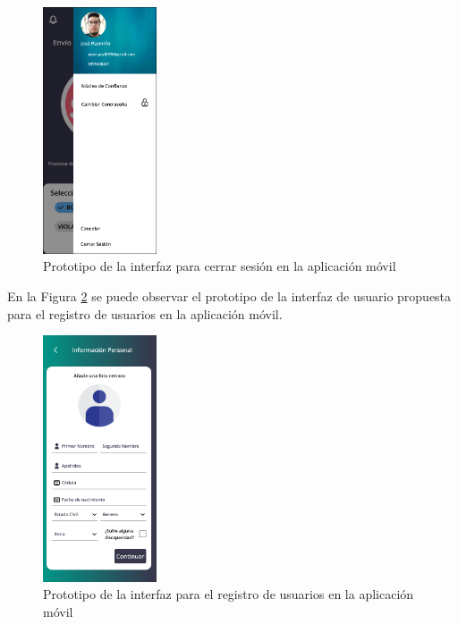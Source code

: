 \begin{figure}[H]
      \centering
      \includegraphics[width=0.3\textwidth]{chapters/III-resultados-y-discusion/resources/images/prototipo-menu-mobile.png}
      \caption{Prototipo de la interfaz para cerrar sesión en la aplicación móvil}
      \label{fig:prototipo-menu-mobile}
\end{figure}

En la Figura \ref{fig:prototipo-registro-mobile} se puede observar el prototipo de la interfaz de usuario propuesta para
el registro de usuarios en la aplicación móvil.

\begin{figure}[H]
      \centering
      \includegraphics[width=0.3\textwidth]{chapters/III-resultados-y-discusion/resources/images/prototipo-registro-mobile.png}
      \caption{Prototipo de la interfaz para el registro de usuarios en la aplicación móvil}
      \label{fig:prototipo-registro-mobile}
\end{figure}


